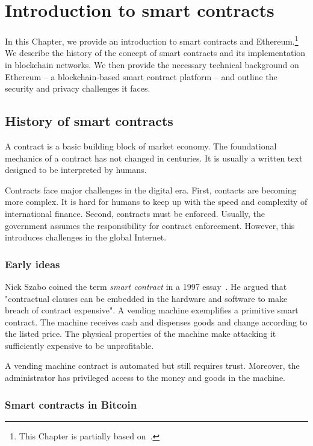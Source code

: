 \chapter{Introduction to smart contracts}

\label{Chapter09Introcontracts}

In this Chapter, we provide an introduction to smart contracts and Ethereum.\footnote{This Chapter is partially based on~\cite{Tikhomirov2017}.}
We describe the history of the concept of smart contracts and its implementation in blockchain networks.
We then provide the necessary technical background on Ethereum -- a blockchain-based smart contract platform -- and outline the security and privacy challenges it faces.


\section{History of smart contracts}

A contract is a basic building block of market economy.
The foundational mechanics of a contract has not changed in centuries.
It is usually a written text designed to be interpreted by humans.

Contracts face major challenges in the digital era.
First, contacts are becoming more complex.
It is hard for humans to keep up with the speed and complexity of international finance.
Second, contracts must be enforced.
Usually, the government assumes the responsibility for contract enforcement.
However, this introduces challenges in the global Internet.


\subsection{Early ideas}

Nick Szabo coined the term \textit{smart contract} in a 1997 essay~\cite{Szabo1997}.
He argued that "contractual clauses \textelp{} can be embedded in the hardware and software \textelp{} to make breach of contract expensive".
A vending machine exemplifies a primitive smart contract.
The machine receives cash and dispenses goods and change according to the listed price.
The physical properties of the machine make attacking it sufficiently expensive to be unprofitable.

A vending machine contract is automated but still requires trust.
Moreover, the administrator has privileged access to the money and goods in the machine.


\subsection{Smart contracts in Bitcoin}


